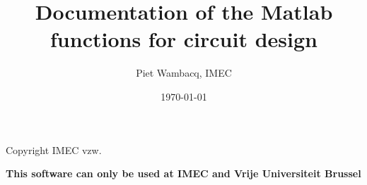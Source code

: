 \documentclass[10pt]{article}
\begin{document}
\title{Documentation of the Matlab functions for circuit design}
\maketitle

\author{Piet Wambacq, IMEC}
\par
\par

\date{\today}

\par
\par
Copyright IMEC vzw.
\par
\par
{\bf This software can only be used at IMEC and Vrije Universiteit Brussel}
\par
\par
%
\tableofcontents
\newpage





\end{document}
